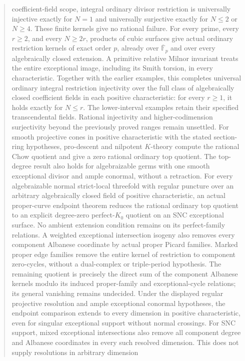 \documentclass[11pt,a4paper]{article}
\begin{document}
\begin{abstract}
coefficient-field scope, integral ordinary divisor restriction is
universally injective exactly for $N=1$ and universally surjective
exactly for $N\le2$ or $N\ge4$. These finite kernels give no rational failure.
For every prime, every $r\ge2$, and every $N\ge2r$, products of
cubic surfaces give actual ordinary restriction kernels of exact
order $p$, already over $\overline{\mathbb F}_p$ and over every
algebraically closed extension. A primitive relative Milnor invariant
treats the entire exceptional image, including its Smith torsion,
in every characteristic. Together with the earlier examples, this
completes universal ordinary integral restriction injectivity over
the full class of algebraically closed coefficient fields in each
positive characteristic: for every $r\ge1$, it holds exactly for
$N\le r$. The lower-interval examples retain their specified
transcendental fields. Rational injectivity and higher-codimension
surjectivity beyond the previously proved ranges remain unsettled.
For smooth projective cones in positive characteristic with the stated
section-ring hypotheses, pro-descent and nilpotent $K$-theory compute
the rational Chow quotient and give a zero rational ordinary top quotient.
The top-degree result also holds for algebraizable germs with one smooth
exceptional divisor and ample conormal, without a retraction.
For every algebraizable normal strict-local threefold with regular puncture
over an arbitrary algebraically closed field of positive characteristic,
an actual proper-curve endpoint theorem reduces the rational ordinary top
quotient to an explicit degree-zero perfect-$K_0$ quotient on an SNC
exceptional surface. No ambient extension condition remains on its
perfect-family relations. A weighted exceptional intersection isogeny
also removes every component Albanese coordinate by actual proper
Picard families. Marked proper edge families remove the entire kernel
of restriction to component zero-cycles, without a dual-complex or
triple-period hypothesis. The remaining quotient is precisely the
direct sum of the component Albanese kernels modulo its induced
proper-family and exceptional-cycle relations; its general vanishing
remains undecided.
Under the displayed regular projective resolution and ample exceptional
conormal hypotheses, the endpoint comparison extends to every dimension
in positive characteristic, even for singular exceptional support without
normal crossings. For SNC support, mixed exceptional intersections also
remove all component degree and Albanese coordinates in every such
resolved dimension. This does not supply resolutions in arbitrary dimension

\end{abstract}
\end{document}
